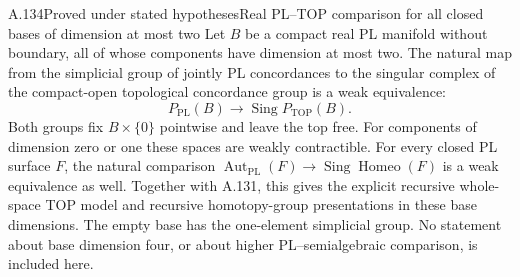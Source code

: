 \begin{saresult}{A.134}{Proved under stated hypotheses}{Real PL--TOP comparison for all closed bases of dimension at most two}
Let $B$ be a compact real PL manifold without boundary, all of whose
components have dimension at most two. The natural map from the simplicial
group of jointly PL concordances to the singular complex of the compact-open
topological concordance group is a weak equivalence:
\[
 P_{\mathrm{PL}}(B)\longrightarrow
 \operatorname{Sing}P_{\mathrm{TOP}}(B).
                                                        \tag{A.134.1}
\]
Both groups fix $B\times\{0\}$ pointwise and leave the top free.
For components of dimension zero or one these spaces are weakly
contractible. For every closed PL surface $F$, the natural comparison
$\operatorname{Aut}_{\mathrm{PL}}(F)\to
\operatorname{Sing}\operatorname{Homeo}(F)$ is a weak equivalence as well.
Together with A.131, this gives the explicit recursive whole-space TOP
model and recursive homotopy-group presentations in these base dimensions.
The empty base has the one-element simplicial group. No statement about
base dimension four, or about higher PL--semialgebraic comparison, is
included here.
\end{saresult}
